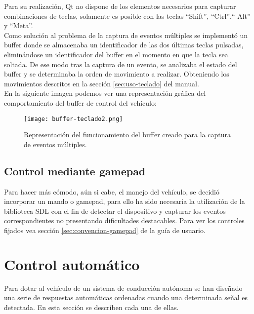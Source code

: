 Para su realización, Qt no dispone de los elementos necesarios para capturar combinaciones de teclas, solamente es posible con las teclas ``Shift'', ``Ctrl'',`` Alt'' y ``Meta''.\\

Como solución al problema de la captura de eventos múltiples se implementó un buffer donde se almacenaba un identificador de las dos últimas teclas pulsadas, eliminándose un identificador del buffer en el momento en que la tecla sea soltada. De ese modo tras la captura de un evento, se analizaba el estado del buffer y se determinaba la orden de movimiento a realizar. Obteniendo los movimientos descritos en la sección \ref{sec:uso-teclado} del manual.\\

En la siguiente imagen podemos ver una representación gráfica del comportamiento del buffer de control del vehículo:\\

\begin{figure}[H]
  \begin{center}
    \texttt{[image: buffer-teclado2.png]}
  \end{center}
  \caption{Representación del funcionamiento del buffer creado para la captura de eventos múltiples.}
  \label{fig:buffer-teclado}
\end{figure}


\subsection{Control mediante gamepad}

Para hacer más cómodo, aún si cabe, el manejo del vehículo, se decidió incorporar un mando o gamepad, para ello ha sido necesaria la utilización de la biblioteca SDL con el fin de detectar el dispositivo y capturar los eventos correspondientes no presentando dificultades destacables. Para ver los controles fijados vea sección \ref{sec:convencion-gamepad} de la guía de usuario.

\section{Control automático}

Para dotar al vehículo de un sistema de conducción autónoma se han diseñado una serie de respuestas automáticas ordenadas cuando una determinada señal es detectada. En esta sección se describen cada una de ellas.\\

